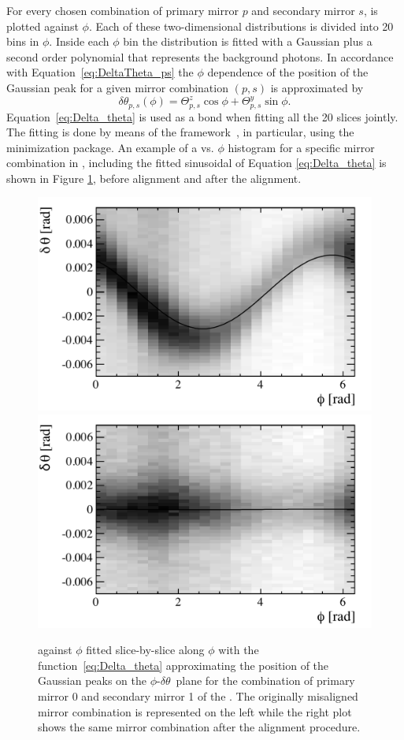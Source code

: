 For every chosen combination of primary mirror $p$ and secondary mirror $s$, \deltatheta is plotted against $\phi$. Each of these two-dimensional distributions is divided into 20 bins in $\phi$. Inside each $\phi$ bin the \deltatheta distribution is fitted with a Gaussian plus a second order polynomial that represents the background photons. In accordance with Equation~\ref{eq:DeltaTheta_ps} the $\phi$ dependence of the position of the Gaussian peak for a given mirror combination $(p,s)$ is approximated by
\begin{equation}
  \label{eq:Delta_theta}
  \delta\theta_{p,s}(\phi) = \varTheta^z_{p,s}\cos\phi
                           + \varTheta^y_{p,s}\sin\phi.                         
\end{equation}
Equation~\ref{eq:Delta_theta} is used as a bond when fitting all the 20 slices jointly.\\
The fitting is done by means of the \root framework~\cite{Antcheva:2011zz}, in particular, using the \minuit minimization package. An example of a \deltatheta vs. $\phi$ histogram for a specific mirror combination in \richone, including the fitted sinusoidal of Equation \ref{eq:Delta_theta} is shown in Figure \ref{fig:Rich1Mirr0001dThetavphiRec}, before alignment and after the alignment.
\begin{figure}[htbp]
  \vspace{-0.5\baselineskip}
  \centering
  \includegraphics[width=.49\textwidth]
    {figs/Method/RICH1_ThetaVsPhiRec0001_misaligned.pdf}
  \includegraphics[width=.49\textwidth]
    {figs/Method/RICH1_ThetaVsPhiRec0001_aligned.pdf}
  \vspace{-1.0\baselineskip}
  \caption{
    \deltatheta against $\phi$ fitted slice-by-slice along $\phi$ with the function~\eqref{eq:Delta_theta} approximating the position of the Gaussian peaks on the $\phi\text{-}\delta\theta$~plane for the combination of primary mirror 0 and secondary mirror 1 of the \richone. The originally misaligned mirror combination is represented on the left while the right plot shows the same mirror combination after the alignment procedure.}
  \label{fig:Rich1Mirr0001dThetavphiRec}
  \vspace{-0.5\baselineskip}
\end{figure}


